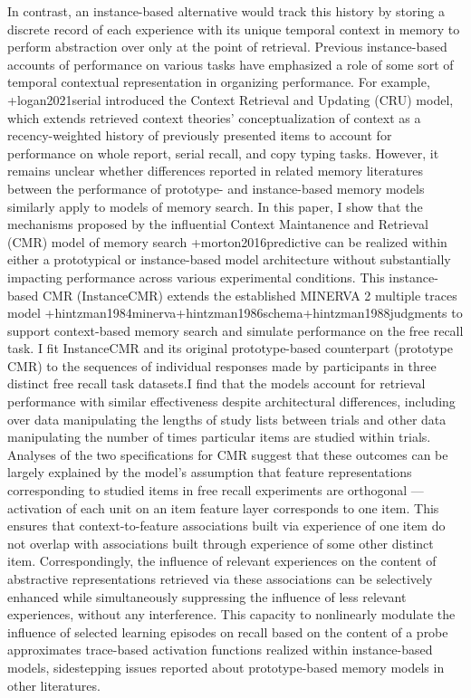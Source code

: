 {}In contrast, an instance-based alternative would track this history by storing a discrete record of each experience with its unique temporal context in memory to perform abstraction over only at the point of retrieval. Previous instance-based accounts of performance on various tasks have emphasized a role of some sort of temporal contextual representation in organizing performance. For example, +{}{}{logan2021serial} introduced the Context Retrieval and Updating (CRU) model, which extends retrieved context theories' conceptualization of context as a recency-weighted history of previously presented items to account for performance on whole report, serial recall, and copy typing tasks. However, it remains unclear whether differences reported in related memory literatures between the performance of prototype- and instance-based memory models similarly apply to models of memory search.\markdownRendererInterblockSeparator
{}\markdownRendererInterblockSeparator
{}In this paper, I show that the mechanisms proposed by the influential Context Maintanence and Retrieval (CMR) model of memory search +{}{}{morton2016predictive} can be realized within either a prototypical or instance-based model architecture without substantially impacting performance across various experimental conditions. This instance-based CMR (InstanceCMR) extends the established MINERVA 2 multiple traces model +{}{}{hintzman1984minerva}+{}{}{hintzman1986schema}+{}{}{hintzman1988judgments} to support context-based memory search and simulate performance on the free recall task. I fit InstanceCMR and its original prototype-based counterpart (prototype CMR) to the sequences of individual responses made by participants in three distinct free recall task datasets.I find that the models account for retrieval performance with similar effectiveness despite architectural differences, including over data manipulating the lengths of study lists between trials and other data manipulating the number of times particular items are studied within trials. \markdownRendererInterblockSeparator
{}Analyses of the two specifications for CMR suggest that these outcomes can be largely explained by the model's assumption that feature representations corresponding to studied items in free recall experiments are orthogonal --- activation of each unit on an item feature layer corresponds to one item. This ensures that context-to-feature associations built via experience of one item do not overlap with associations built through experience of some other distinct item. Correspondingly, the influence of relevant experiences on the content of abstractive representations retrieved via these associations can be selectively enhanced while simultaneously suppressing the influence of less relevant experiences, without any interference. This capacity to nonlinearly modulate the influence of selected learning episodes on recall based on the content of a probe approximates trace-based activation functions realized within instance-based models, sidestepping issues reported about prototype-based memory models in other literatures.\relax